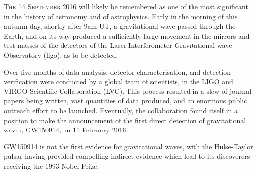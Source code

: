 

\lettrine[lines=3]{T}{he 14 September 2016} will likely be remembered as one of the most
significant in the history of astronomy and of astrophysics. Early in
the morning of this autumn day, shortly after 9am UT, a gravitational
wave passed through the Earth, and on its way produced a sufficiently
large movement in the mirrors and test masses of the detectors of the
Laser Interferometer Gravitational-wave Observatory (\gls{ligo}), as to be
detected.

Over five months of data analysis, detector characterisation, and
detection verification were conducted by a global team of scientists,
in the LIGO and VIRGO Scientific Collaboration (LVC). This process
resulted in a slew of journal papers being written, vast quantities of
data produced, and an enormous public outreach effort to be
launched. Eventually, the collaboration found itself in a position to
make the announcement of the first direct detection of gravitational
waves, GW150914, on 11 February 2016.

GW150914 is not the first evidence for gravitational waves, with the
Hulse-Taylor pulsar\cite{1975ApJ...195L..51H,2005ASPC..328...25W}
having provided compelling indirect evidence which lead to its
discoverers receiving the 1993 Nobel Prize.

